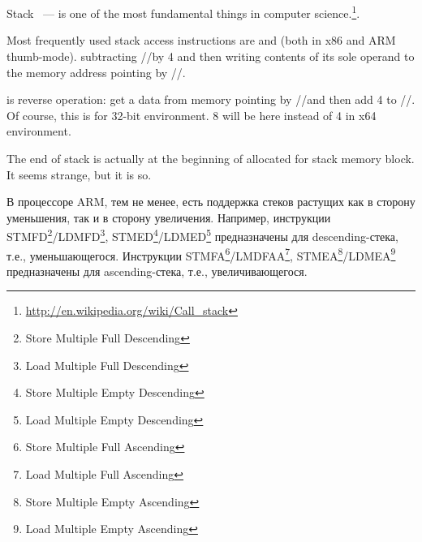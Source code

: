 \section{}
\label{sec:stack}

{Stack ~--- is one of the most fundamental things in computer science.}\footnote{\url{http://en.wikipedia.org/wiki/Call_stack}}.


{Most frequently used stack access instructions are \PUSH and \POP (both in x86 and ARM thumb-mode). 
\PUSH subtracting \ESP/\RSP/\SP by 4 and then writing contents of its sole operand to the memory address pointing by \ESP/\RSP/\SP.} 

{\POP is reverse operation: get a data from memory pointing by \ESP/\RSP/\SP and then add 4 to \ESP/\RSP/\SP. 
Of course, this is for 32-bit environment. 8 will be here instead of 4 in x64 environment.}

{The end of stack is actually at the beginning of allocated for stack memory block. 
It seems strange, but it is so.}

В процессоре ARM, тем не менее, есть поддержка стеков растущих как в сторону уменьшения, так и в
сторону увеличения. 
Например, инструкции 
STMFD\footnote{Store Multiple Full Descending}/LDMFD\footnote{Load Multiple Full Descending}, 
STMED\footnote{Store Multiple Empty Descending}/LDMED\footnote{Load Multiple Empty Descending} 
предназначены для descending-стека, т.е., уменьшающегося.
Инструкции 
STMFA\footnote{Store Multiple Full Ascending}/LMDFAA\footnote{Load Multiple Full Ascending}, 
STMEA\footnote{Store Multiple Empty Ascending}/LDMEA\footnote{Load Multiple Empty Ascending} 
предназначены для ascending-стека, т.е., увеличивающегося.

